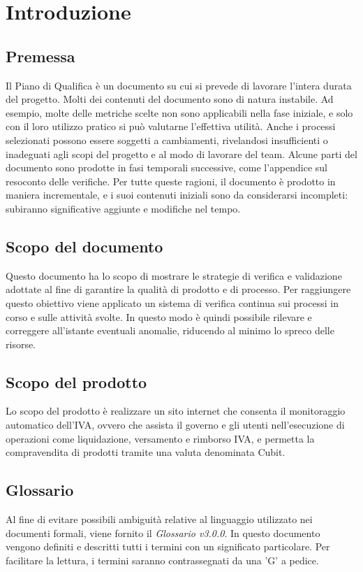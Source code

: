 \section{Introduzione}
\subsection{Premessa}
Il Piano di Qualifica è un documento su cui si prevede di lavorare l'intera durata del progetto.\newline 
Molti dei contenuti del documento sono di natura instabile. Ad esempio, molte delle metriche scelte non sono applicabili nella fase iniziale, e solo con il loro utilizzo pratico si può valutarne l'effettiva utilità. Anche i processi selezionati possono essere soggetti a cambiamenti, rivelandosi insufficienti o inadeguati agli scopi del progetto e al modo di lavorare del team.\newline 
Alcune parti del documento sono prodotte in fasi temporali successive, come l'appendice sul resoconto delle verifiche.\newline 
Per tutte queste ragioni, il documento è prodotto in maniera incrementale, e i suoi contenuti iniziali sono da considerarsi incompleti: subiranno significative aggiunte e modifiche nel tempo.
\subsection{Scopo del documento}
Questo documento ha lo scopo di mostrare le strategie di verifica e validazione adottate al fine di garantire la qualità di prodotto e di processo. Per raggiungere questo obiettivo viene applicato un sistema di verifica continua sui processi in corso e sulle attività svolte. In questo modo è quindi possibile rilevare e correggere all'istante eventuali anomalie, riducendo al minimo lo spreco delle risorse.
\subsection{Scopo del prodotto}
Lo scopo del prodotto è realizzare un sito internet che consenta il monitoraggio automatico dell'IVA, ovvero che assista il governo e gli utenti nell'esecuzione di operazioni come liquidazione, versamento e rimborso IVA, e permetta la compravendita di prodotti tramite una valuta denominata Cubit\glo.
\subsection{Glossario}
Al fine di evitare possibili ambiguità relative al linguaggio utilizzato nei documenti formali, viene fornito il \textit{Glossario v3.0.0}. In questo documento vengono definiti e descritti tutti i termini con un significato particolare. Per facilitare la lettura, i termini saranno contrassegnati da una 'G' a pedice.
